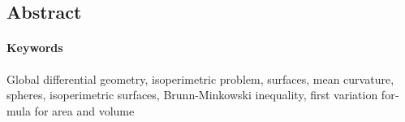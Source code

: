 \begin{otherlanguage}{american}
\section{Abstract}



\paragraph{Keywords} Global differential geometry, isoperimetric problem, surfaces, mean curvature, spheres, isoperimetric surfaces, Brunn-Minkowski inequality, first variation formula for area and volume

\end{otherlanguage}